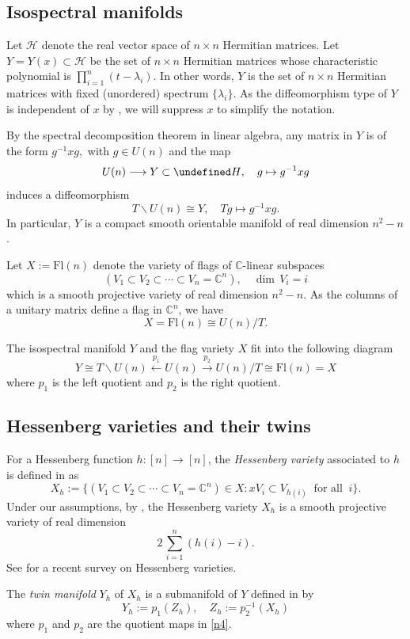 \documentclass[11pt]{article}
\theoremstyle{definition}
\numberwithin{equation}{section}
\let\cal\undefined
\numberwithin{equation}{section}
\newcommand{\C}{\mathbb{C}}
\newcommand\CC{\mathbb{C}}
\newcommand{\cal}{\mathcal}
\newcommand\cH{{\cal H}}
\newcommand\lra{\longrightarrow }
\newcommand\beq{\begin{equation}}
\newcommand\eeq{\end{equation}}
\newcommand\Fl{\mathrm{Fl}}
\begin{document}
\subsection{Isospectral manifolds} \label{n46} 
Let $\mathcal{H}$ denote the real vector space of $n\times n$ Hermitian matrices. 
Let $Y=Y(x)\subset \mathcal{H}$ be the set of $n\times n$ Hermitian matrices whose characteristic polynomial is $\prod_{i=1}^n(t-\lambda_i)$.  In other words, $Y$ is the set of $n\times n$ Hermitian matrices with fixed (unordered) spectrum $\{\lambda_i\}$. 
As the diffeomorphism type of $Y$ is independent of $x$ by \cite[Theorem 3.5]{AB}, we will suppress $x$ to simplify the notation.   

By the spectral decomposition theorem in linear algebra, any matrix in $Y$ is of the form
$g^{-1}xg,$ with $g\in U(n)$
and the map  \[ U(n)\lra Y\subset \cH,  \quad g\mapsto g^{-1}xg\]
induces a diffeomorphism 
\beq\label{n7} T\backslash U(n)\cong Y,\quad Tg\mapsto g^{-1}xg.\eeq
In particular, $Y$ is a compact smooth orientable manifold of real dimension $n^2-n$. 

Let $X:=\Fl(n)$ denote the variety of flags of $\CC$-linear subspaces
$$(V_1\subset V_2\subset\cdots\subset V_n=\CC^n), \quad \dim\, V_i=i$$
which is a smooth projective variety of real dimension $n^2-n$. 
As the columns of a unitary matrix define a flag in $\CC^n$, we have 
$$X=\Fl(n)\cong U(n)/T.$$

The isospectral manifold $Y$ and the flag variety $X$ fit into the following diagram
\beq\label{n4}
Y\cong T\backslash U(n)\xleftarrow{~p_1~}U(n)\xrightarrow{~p_2~}U(n)/T\cong \Fl(n)=X
\eeq
where $p_1$ is the left quotient and $p_2$ is the right quotient. 



\subsection{Hessenberg varieties and their twins}\label{n29}

For a Hessenberg function $h:[n]\to [n]$, the \emph{Hessenberg variety} associated to $h$ is
defined in \cite{DMPS} as 
\[X_h:=\{(V_1\subset V_2\subset \cdots \subset  V_{n}= \C^n)\in X : xV_i\subset V_{h(i)} ~\text{ for all }~ i\}.\]
Under our assumptions, by \cite{DMPS}, 
the Hessenberg variety $X_h$ is a smooth projective variety of real dimension 
\beq\label{n6}
2\, \sum_{i=1}^n (h(i)-i).\eeq
See \cite{AH} for a recent survey on Hessenberg varieties.


The \emph{twin manifold} $Y_h$ of $X_h$ is a submanifold of $Y$ defined in \cite{AB}  by 
\beq\label{n5} Y_h:=p_1(Z_h), \quad Z_h:=p_2^{-1}(X_h)\eeq
where $p_1$ and $p_2$ are the quotient maps in \eqref{n4}.
\end{document}
